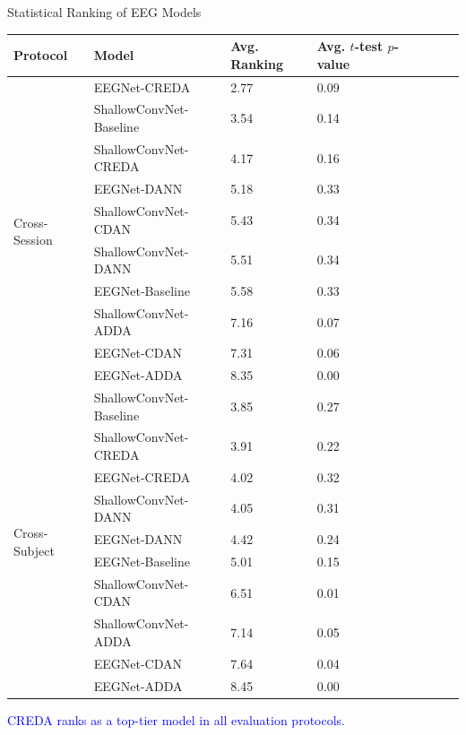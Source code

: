 \documentclass[aspectratio=169]{beamer}
\begin{document}
\begin{frame}{Statistical Ranking of EEG Models}
\begin{table}
\tiny
\centering
\begin{tabularx}{\linewidth}{p{3.0cm}p{4.5cm}p{4.5cm}p{4.5cm}l l c c}
\toprule
\textbf{Protocol} & \textbf{Model} & \textbf{Avg. Ranking} & \textbf{Avg. $t$-test $p$-value} \\
\midrule
\multirow{10}{*}{Cross-Session}
  & EEGNet-CREDA            & 2.77 & 0.09 \\
  & ShallowConvNet-Baseline & 3.54 & 0.14 \\
  & ShallowConvNet-CREDA    & 4.17 & 0.16 \\
  & EEGNet-DANN             & 5.18 & 0.33 \\
  & ShallowConvNet-CDAN     & 5.43 & 0.34 \\
  & ShallowConvNet-DANN     & 5.51 & 0.34 \\
  & EEGNet-Baseline         & 5.58 & 0.33 \\
  & ShallowConvNet-ADDA     & 7.16 & 0.07 \\
  & EEGNet-CDAN             & 7.31 & 0.06 \\
  & EEGNet-ADDA             & 8.35 & 0.00 \\
\midrule
\multirow{10}{*}{Cross-Subject}
  & ShallowConvNet-Baseline & 3.85 & 0.27 \\
  & ShallowConvNet-CREDA    & 3.91 & 0.22 \\
  & EEGNet-CREDA            & 4.02 & 0.32 \\
  & ShallowConvNet-DANN     & 4.05 & 0.31 \\
  & EEGNet-DANN             & 4.42 & 0.24 \\
  & EEGNet-Baseline         & 5.01 & 0.15 \\
  & ShallowConvNet-CDAN     & 6.51 & 0.01 \\
  & ShallowConvNet-ADDA     & 7.14 & 0.05 \\
  & EEGNet-CDAN             & 7.64 & 0.04 \\
  & EEGNet-ADDA             & 8.45 & 0.00 \\
\bottomrule
\end{tabularx}
\label{tab:eeg_ranking}
\end{table}


\begin{center}
    \textcolor{blue}{CREDA ranks as a top-tier model in all evaluation protocols.}
\end{center}
\end{frame}
\end{document}
